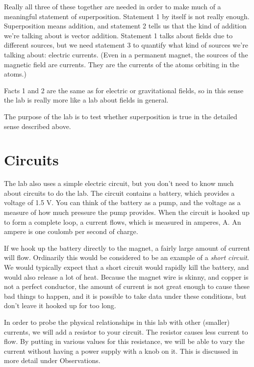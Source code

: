 Really all three of these together are needed in order to make much of a meaningful statement of superposition.
Statement 1 by itself is not really enough. 
Superposition means addition, and statement 2 tells us that the kind of addition we're talking about is vector addition.
Statement 1 talks about fields due to different sources, but we need statement 3 to quantify what kind of sources
we're talking about: electric currents. (Even in a permanent magnet, the sources of the magnetic field are
currents. They are the currents of the atoms orbiting in the atoms.)

Facts 1 and 2 are the same as for electric or gravitational fields, so in this sense the lab is really more like a lab about
fields in general.

The purpose of the lab is to test whether superposition is true in the detailed sense described above.

\section*{Circuits}

The lab also uses a simple electric circuit, but you don't need to know much about circuits to do the lab.
The circuit contains a battery, which provides a voltage of 1.5 V. You can think of the battery as a pump, and the
voltage as a measure of how much pressure the pump provides. When the circuit is hooked up to form a complete loop,
a current flows, which is measured in amperes, A. An ampere is one coulomb per second of charge.

If we hook up
the battery directly to the magnet, a fairly large amount of current will flow. Ordinarily this would be considered
to be an example of a \emph{short circuit}. We would typically expect that a short circuit would rapidly kill the battery, and
would also release a lot of heat.
Because the magnet wire is skinny, and copper is not a perfect conductor, the amount of current is not great
enough to cause these bad things to happen, and it is possible to take data under these conditions, but don't
leave it hooked up for too long.

In order to probe the physical relationships in this lab with other (smaller) currents, we will add a resistor to your circuit.
The resistor causes less current to flow. By putting in various values for this resistance,
we will be able to vary the current without having a power supply with a knob on it. This is discussed in more detail
under Observations.

